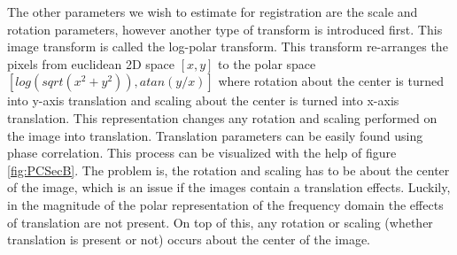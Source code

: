 The other parameters we wish to estimate for registration are the scale and rotation parameters, however another type of transform is introduced first. This image transform is called the log-polar transform. This transform re-arranges the pixels from euclidean 2D space $[x,y]$ to the polar space $[log(sqrt(x^2+y^2)),atan(y/x)]$ where rotation about the center is turned into y-axis translation and scaling about the center is turned into x-axis translation. This representation changes any rotation and scaling performed on the image into translation. Translation parameters can be easily found using phase correlation. This process can be visualized with the help of figure \ref{fig:PCSecB}. The problem is, the rotation and scaling has to be about the center of the image, which is an issue if the images contain a translation effects. Luckily, in the magnitude of the polar representation of the frequency domain the effects of translation are not present. On top of this, any rotation or scaling (whether translation is present or not) occurs about the center of the image. \\


